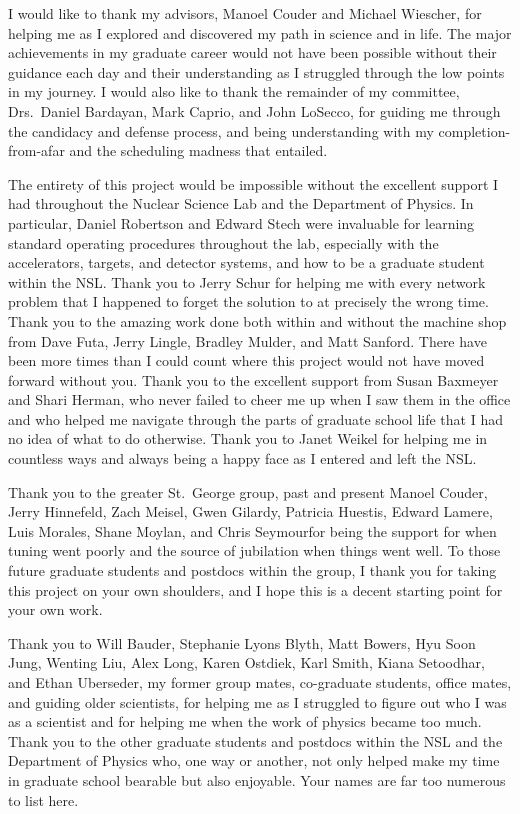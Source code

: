 
\begin{acknowledge}

I would like to thank my advisors, Manoel Couder and Michael Wiescher,
for helping me as I explored and discovered my path in science and in
life. The major achievements in my graduate career would not have been
possible without their guidance each day and their understanding as I
struggled through the low points in my journey. I would also like to
thank the remainder of my committee, Drs.\ Daniel Bardayan, Mark Caprio,
and John LoSecco, for guiding me through the candidacy and defense
process, and being understanding with my completion-from-afar and the
scheduling madness that entailed.

The entirety of this project would be impossible without the excellent
support I had throughout the Nuclear Science Lab and the Department of
Physics. In particular, Daniel Robertson and Edward Stech were
invaluable for learning standard operating procedures throughout the
lab, especially with the accelerators, targets, and detector systems,
and how to be a graduate student within the NSL. Thank you to Jerry
Schur for helping me with every network problem that I happened to
forget the solution to at precisely the wrong time. Thank you to the
amazing work done both within and without the machine shop from Dave
Futa, Jerry Lingle, Bradley Mulder, and Matt Sanford. There have been
more times than I could count where this project would not have moved
forward without you. Thank you to the excellent support from Susan
Baxmeyer and Shari Herman, who never failed to cheer me up when I saw
them in the office and who helped me navigate through the parts of
graduate school life that I had no idea of what to do otherwise. Thank
you to Janet Weikel for helping me in countless ways and always being a
happy face as I entered and left the NSL.

Thank you to the greater St.\ George group, past and
present\textemdash{} Manoel Couder, Jerry Hinnefeld, Zach Meisel, Gwen
Gilardy, Patricia Huestis, Edward Lamere, Luis Morales, Shane Moylan,
and Chris Seymour\textemdash{}for being the support for when tuning went
poorly and the source of jubilation when things went well. To those
future graduate students and postdocs within the group, I thank you for
taking this project on your own shoulders, and I hope this is a decent
starting point for your own work.

Thank you to Will Bauder, Stephanie Lyons Blyth, Matt Bowers, Hyu Soon
Jung, Wenting Liu, Alex Long, Karen Ostdiek, Karl Smith, Kiana
Setoodhar, and Ethan Uberseder, my former group mates, co-graduate
students, office mates, and guiding older scientists, for helping me as
I struggled to figure out who I was as a scientist and for helping me
when the work of physics became too much. Thank you to the other
graduate students and postdocs within the NSL and the Department of
Physics who, one way or another, not only helped make my time in
graduate school bearable but also enjoyable. Your names are far too
numerous to list here.


\end{acknowledge}

